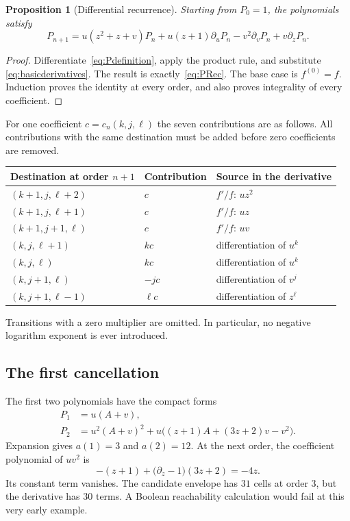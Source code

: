 \documentclass[11pt]{article}
\numberwithin{equation}{section}
\newtheorem{proposition}[theorem]{Proposition}
\theoremstyle{definition}
\theoremstyle{remark}
\begin{document}
\begin{proposition}[Differential recurrence]\label{prop:recurrence}
Starting from $P_0=1$, the polynomials satisfy
\begin{equation}\label{eq:PRec}
 P_{n+1}=u(z^2+z+v)P_n+u(z+1)\partial_uP_n
          -v^2\partial_vP_n+v\partial_zP_n.
\end{equation}
\end{proposition}
\begin{proof}
Differentiate~\eqref{eq:Pdefinition}, apply the product rule, and substitute
\eqref{eq:basicderivatives}. The result is exactly~\eqref{eq:PRec}.
The base case is $f^{(0)}=f$. Induction proves the identity at every order,
and also proves integrality of every coefficient.
\end{proof}

For one coefficient $c=c_n(k,j,\ell)$ the seven contributions are as follows.
All contributions with the same destination must be added before zero
coefficients are removed.
\begin{center}
\begin{tabular}{lll}
\toprule
Destination at order $n+1$ & Contribution & Source in the derivative\\
\midrule
$(k+1,j,\ell+2)$ & $c$ & $f'/f$: $uz^2$\\
$(k+1,j,\ell+1)$ & $c$ & $f'/f$: $uz$\\
$(k+1,j+1,\ell)$ & $c$ & $f'/f$: $uv$\\
$(k,j,\ell+1)$ & $kc$ & differentiation of $u^k$\\
$(k,j,\ell)$ & $kc$ & differentiation of $u^k$\\
$(k,j+1,\ell)$ & $-jc$ & differentiation of $v^j$\\
$(k,j+1,\ell-1)$ & $\ell c$ & differentiation of $z^\ell$\\
\bottomrule
\end{tabular}
\end{center}
Transitions with a zero multiplier are omitted. In particular, no negative
logarithm exponent is ever introduced.

\subsection{The first cancellation}

The first two polynomials have the compact forms
\begin{align}
 P_1&=u(A+v),\label{eq:P1}\\
 P_2&=u^2(A+v)^2+
 u\bigl((z+1)A+(3z+2)v-v^2\bigr).\label{eq:P2}
\end{align}
Expansion gives $a(1)=3$ and $a(2)=12$. At the next order, the coefficient
polynomial of $uv^2$ is
\[
 -(z+1)+\bigl(\partial_z-1\bigr)(3z+2)=-4z.
\]
Its constant term vanishes. The candidate envelope has $31$ cells at order
$3$, but the derivative has $30$ terms. A Boolean reachability calculation
would fail at this very early example.
\end{document}

